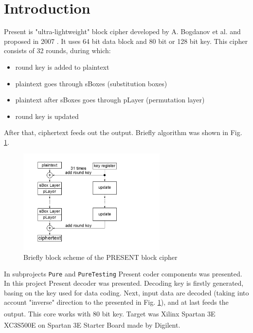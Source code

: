 \documentclass{gajewski}
\begin{document}
\maketitle

\newpage

\revisionTable

\newpage

\tableofcontents
\newpage

\section{Introduction}

Present is "ultra-lightweight" block cipher developed by A. Bogdanov et al. and proposed in 2007 \cite{PRESENT}. It uses 64 bit data block and 80 bit or 128 bit key.
This cipher consists of 32 rounds, during which: 
\begin{itemize}
    \item round key is added to plaintext
    \item plaintext goes through sBoxes (substitution boxes)
    \item plaintext after sBoxes goes through pLayer (permutation layer)
    \item round key is updated
\end{itemize}
After that, ciphertext feeds out the output. Briefly algorithm was shown in Fig. \ref{pAlgorithm}.
\begin{figure}[!ht]%
    \begin{center}
    \includegraphics[width=0.66\textwidth]{img/presentAlgorithm.png}
    \caption{%
        Briefly block scheme of the PRESENT block cipher
     }%
    \label{pAlgorithm}
    \end{center}
 \end{figure}
In subprojects \texttt{Pure} and \texttt{PureTesting} Present coder components was presented. In this project Present decoder was presented. Decoding key is firstly generated, basing on the key used for data coding. Next, input data are decoded (taking into account "inverse" direction to the presented in Fig. \ref{pAlgorithm}), and at last feeds the output. This core works with 80 bit key. Target was Xilinx\textsuperscript{\textregistered} Spartan 3E XC3S500E \cite{Spartan} on Spartan 3E  Starter Board \cite{Digilent} made by Digilent\textsuperscript{\textregistered}.
\end{document}

